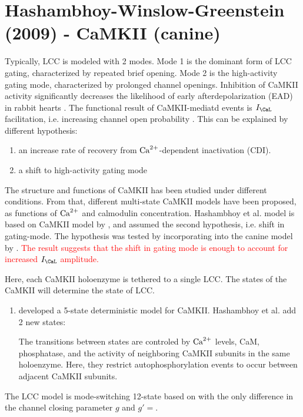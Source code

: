 \section[Hashambhoy-Winslow-Greenstein (2009)]{Hashambhoy-Winslow-Greenstein
(2009) - CaMKII (canine)}
\label{sec:LCC_CaMKII_Hashambhoy2009}



Typically, LCC is modeled with 2 modes. Mode 1 is the dominant form of LCC
gating, characterized by repeated brief opening. Mode 2 is the high-activity
gating mode, characterized by prolonged channel openings. 
Inhibition of CaMKII activity significantly decreases the likelihood of early
afterdepolarization (EAD) in rabbit hearts \citep{Dzhura2000}. The functional
result of CaMKII-mediatd events is $I_\CaL$ facilitation, i.e. increasing channel open
probability \citep{}. This can be explained by different hypothesis:
\begin{enumerate}
  \item an increase rate of recovery from ${\text{Ca}^{2+}}$-dependent inactivation (CDI).
  \item a shift to high-activity gating mode
\end{enumerate} 
The structure and functions of CaMKII has been studied under different
conditions. From that, different multi-state CaMKII models have been proposed,
as functions of ${\text{Ca}^{2+}}$ and calmodulin concentration\citep{Kubota2001,Dupont2003}.
Hashambhoy et al. model is based on CaMKII model by \citep{Dupont2003}, and
assumed the second hypothesis, i.e. shift in gating-mode.
The hypothesis was tested by incorporating into the canine model by
\citep{greenstein2002}. \textcolor{red}{The result suggests that the shift in
gating mode is enough to account for increased $I_\CaL$ amplitude.}

Here, each CaMKII holoenzyme is tethered to a single LCC. The states of the
CaMKII will determine the state of LCC. 
\begin{enumerate}
  \item \citep{Dupont2003} developed a 5-state
deterministic model for CaMKII. Hashambhoy et al. add 2 new states: 

The transitions between states are controled by ${\text{Ca}^{2+}}$ levels, CaM, phosphatase,
and the activity of neighboring CaMKII subunits in the same holoenzyme. Here,
they restrict autophosphorylation events to
occur between adjacent CaMKII  subunits. 
   
\end{enumerate}


The LCC model is mode-switching 12-state based on \citep{greenstein2002} with
the only difference in the channel closing parameter $g$ and $g'=$.  




